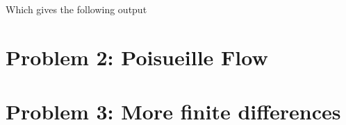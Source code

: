 \documentclass[10pt, a4paper]{amsart}
\begin{document}


Which gives the following output
 
\section{Problem 2: Poisueille Flow}
\section{Problem 3: More finite differences}




% 

\end{document}
